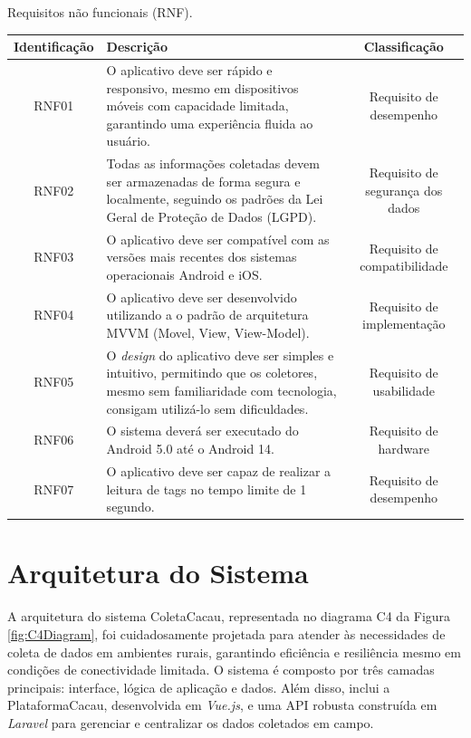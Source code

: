 \begin{quadro}[H]
	\centering
		\footnotesize
	\caption{Requisitos não funcionais (RNF).}
	\begin{tabular}{|c|p{8cm}|c|}
		\hline
		\textbf{Identificação} & \centering\textbf{Descrição} & \textbf{Classificação}\\
		\hline
		RNF01 & O aplicativo deve ser rápido e responsivo, mesmo em dispositivos móveis com capacidade limitada, garantindo uma experiência fluida ao usuário.   & Requisito de desempenho  \\ \hline
		
		RNF02 & Todas as informações coletadas devem ser armazenadas de forma segura e localmente, seguindo os padrões da Lei Geral de Proteção de Dados (LGPD).    & Requisito de segurança dos dados  \\ \hline
		
		RNF03 & O aplicativo deve ser compatível com as versões mais recentes dos sistemas operacionais Android e iOS. & Requisito de compatibilidade \\ \hline
		
		RNF04 & O aplicativo deve ser desenvolvido utilizando a o padrão de arquitetura MVVM (Movel, View, View-Model). & Requisito de implementação \\ \hline
		
		RNF05 & O \textit{design} do aplicativo deve ser simples e intuitivo, permitindo que os coletores, mesmo sem familiaridade com tecnologia, consigam utilizá-lo sem dificuldades. & Requisito de usabilidade \\ \hline
        
            RNF06 & O sistema deverá ser executado do Android 5.0 até o Android 14.  & Requisito de hardware \\ \hline

            RNF07 & O aplicativo deve ser capaz de realizar a leitura de tags no tempo limite de 1 segundo.  & Requisito de desempenho \\ \hline
	\end{tabular}
    \label{Tab:NonFunctionalReqs}
\end{quadro}

\section{Arquitetura do Sistema}
A arquitetura do sistema ColetaCacau, representada no diagrama C4 da Figura \ref{fig:C4Diagram}, foi cuidadosamente projetada para atender às necessidades de coleta de dados em ambientes rurais, garantindo eficiência e resiliência mesmo em condições de conectividade limitada. O sistema é composto por três camadas principais: interface, lógica de aplicação e dados. Além disso, inclui a PlataformaCacau, desenvolvida em \textit{Vue.js}, e uma API robusta construída em \textit{Laravel} para gerenciar e centralizar os dados coletados em campo.

